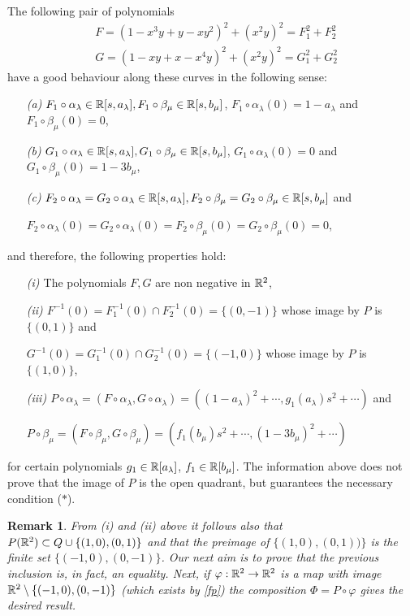 \documentclass[11pt,draft]{article}
\newtheorem{sremark}[thm]{Remark}
\begin{document}
The following pair of polynomials
\begin{equation*}
\begin{split}
&F=(1-x^3y+y-xy^2)^2+(x^2y)^2=F_1^2+F_2^2\\
&G=(1-xy+x-x^4y)^2+(x^2y)^2=G_1^2+G_2^2
\end{split}
\end{equation*}
have a good behaviour along these curves in the following sense:
\begin{itemize}
\item [\em (a)\em] $F_1\circ\alpha_{\lambda }\in{\mathbb R}[s,a_{\lambda
}],F_1\circ\beta_{\mu}\in{\mathbb R}[s,b_{\mu}]$,
$F_1\circ\alpha_{\lambda }(0)=1-a_{\lambda }$ and $F_1\circ\beta_{\mu}(0)=0$,
\item [\em (b)\em] $G_1\circ\alpha_{\lambda }\in{\mathbb R}[s,a_{\lambda
}],G_1\circ\beta_{\mu}\in{\mathbb R}[s,b_{\mu}]$,
$G_1\circ\alpha_{\lambda }(0)=0$ and $G_1\circ\beta_{\mu}(0)=1-3b_{\mu}$,
\item [\em (c)\em]
$F_2\circ\alpha_{\lambda }=G_2\circ\alpha_{\lambda
}\in{\mathbb R}[s,a_{\lambda }],F_2\circ\beta_{\mu}=G_2\circ\beta_{\mu}\in{\mathbb R}[s,b_{\mu}]$ and

$F_2\circ\alpha_{\lambda }(0)=G_2\circ\alpha_{\lambda
}(0)=F_2\circ\beta_{\mu}(0)=G_2\circ\beta_{\mu}(0)=0$, 
\end{itemize}
and therefore, the following properties hold:
\begin{itemize}
\item [\em (i) \em] The polynomials $F,G$ are non negative in ${\mathbb R}^2$,
\item [\em (ii) \em] $F^{-1}(0)=F_1^{-1}(0)\cap F_2^{-1}(0)=\{(0,-1)\}$ whose image by $P$
is $\{(0,1)\}$ and 

$G^{-1}(0)=G_1^{-1}(0)\cap G_2^{-1}(0)=\{(-1,0)\}$ whose image by $P$ is $\{(1,0)\}$,
\item [\em (iii) \em]
$P\circ\alpha_{\lambda
}=(F\circ\alpha_{\lambda },G\circ\alpha_{\lambda
})=((1-a_\lambda)^2+\cdots,g_1(a_\lambda)s^2+\cdots)$ and

$P\circ\beta_{\mu}=(F\circ\beta_{\mu},G\circ\beta_{\mu})=(f_1(b_\mu)s^2+\cdots,(1-3b_\mu)^2+\cdots)$ 
\end{itemize}
for certain polynomials $g_1\in{\mathbb R}[a_{\lambda}]$, $f_1\in{\mathbb R}[b_{\mu}]$. The information above
does not prove that the image of $P$ is the open quadrant, but guarantees the necessary
condition ($\ast$).

\begin{sremark}
\em
From \em (i) \em and \em (ii) \em above it follows also that
$P({\mathbb R}^2)\subset Q\cup\{(1,0),(0,1)\}$ and that the preimage of $\{(1,0),(0,1))\}$ is the
finite set $\{(-1,0),(0,-1)\}$. Our next aim is to prove that the previous inclusion is, in
fact, an equality. Next, if
$\varphi:{\mathbb R}^2\rightarrow{\mathbb R}^2$ is a map with image
${\mathbb R}^2\setminus\{(-1,0),(0,-1)\}$ (which exists by \ref{fp}) the composition
$\Phi=P\circ\varphi$ gives the desired result.
\em
\end{sremark}
\end{document}
